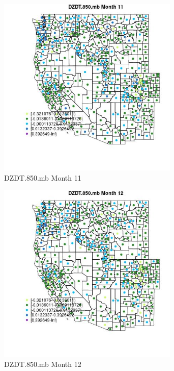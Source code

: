 \begin{figure} 
\centering  
\includegraphics[width=0.77\textwidth]{Code_Outputs/df_report_ML_predictors_CountyCentroid_Locations_Dates_2008-01-01to2018-12-31_MapObsMo11DZDT850mb.jpg} 
\caption{\label{fig:df_report_ML_predictors_CountyCentroid_Locations_Dates_2008-01-01to2018-12-31MapObsMo11DZDT850mb}DZDT.850.mb Month 11} 
\end{figure} 
 

\begin{figure} 
\centering  
\includegraphics[width=0.77\textwidth]{Code_Outputs/df_report_ML_predictors_CountyCentroid_Locations_Dates_2008-01-01to2018-12-31_MapObsMo12DZDT850mb.jpg} 
\caption{\label{fig:df_report_ML_predictors_CountyCentroid_Locations_Dates_2008-01-01to2018-12-31MapObsMo12DZDT850mb}DZDT.850.mb Month 12} 
\end{figure} 
 

